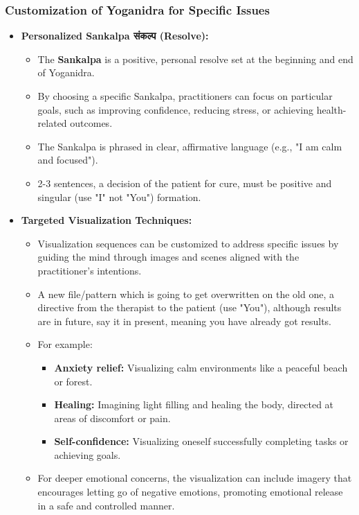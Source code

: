 \begin{frame}[fragile]\frametitle{Customization of Yoganidra for Specific Issues}
    \begin{itemize}
        \item \textbf{Personalized Sankalpa संकल्प  (Resolve):}
            \begin{itemize}
                \item The \textbf{Sankalpa} is a positive, personal resolve set at the beginning and end of Yoganidra.
                \item By choosing a specific Sankalpa, practitioners can focus on particular goals, such as improving confidence, reducing stress, or achieving health-related outcomes.
                \item The Sankalpa is phrased in clear, affirmative language (e.g., "I am calm and focused").
				\item 2-3 sentences, a decision of the patient for cure, must be positive and singular (use "I" not "You") formation.
            \end{itemize}
        
        \item \textbf{Targeted Visualization Techniques:}
            \begin{itemize}
                \item Visualization sequences can be customized to address specific issues by guiding the mind through images and scenes aligned with the practitioner’s intentions.
				\item A new file/pattern which is going to get overwritten on the old one, a directive from the therapist to the patient (use "You"), although results are in future, say it in present, meaning you have already got results.
                \item For example:
                    \begin{itemize}
                        \item \textbf{Anxiety relief:} Visualizing calm environments like a peaceful beach or forest.
                        \item \textbf{Healing:} Imagining light filling and healing the body, directed at areas of discomfort or pain.
                        \item \textbf{Self-confidence:} Visualizing oneself successfully completing tasks or achieving goals.
                    \end{itemize}
                \item For deeper emotional concerns, the visualization can include imagery that encourages letting go of negative emotions, promoting emotional release in a safe and controlled manner.					
            \end{itemize}
    \end{itemize}
\end{frame}


